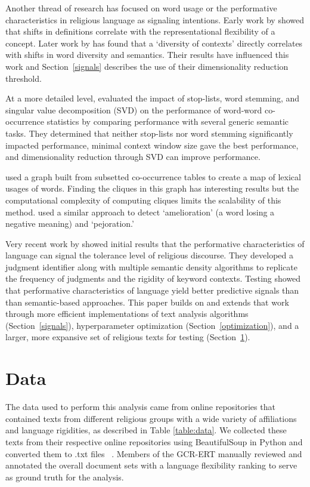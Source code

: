 \documentclass[11pt, a4paper]{article}
\begin{document}
Another thread of research has focused on word usage or the performative characteristics in religious language as signaling intentions. Early work by   showed that shifts in definitions correlate with the representational flexibility of a concept. Later work by  has found that a `diversity of contexts' directly correlates with shifts in word diversity and semantics. Their results have influenced this work and Section~\ref{signals} describes the use of their dimensionality reduction threshold.

At a more detailed level,  evaluated the impact of stop-lists, word stemming, and singular value decomposition (SVD) on the performance of word-word co-occurrence statistics by comparing performance with several generic semantic tasks. They determined that neither stop-lists nor word stemming significantly impacted performance, minimal context window size gave the best performance, and dimensionality reduction through SVD can improve performance.  

 used a graph built from subsetted co-occurrence tables to create a map of lexical usages of words. Finding the cliques in this graph has interesting results but the computational complexity of computing cliques limits the scalability of this method.  used a similar approach to detect `amelioration' (a word losing a negative meaning) and `pejoration.' 

Very recent work by  showed initial results that the performative characteristics of language can signal the tolerance level of religious discourse. They developed a judgment identifier along with multiple semantic density algorithms to replicate the frequency of judgments and the rigidity of keyword contexts. Testing showed that performative characteristics of language yield better predictive signals than than semantic-based approaches. This paper builds on and extends that work through more efficient implementations of text analysis algorithms (Section~\ref{signals}), hyperparameter optimization (Section~\ref{optimization}), and a larger, more expansive set of religious texts for testing (Section~\ref{data}).  

\section{Data}\label{data}

The data used to perform this analysis came from online repositories that contained texts from different religious groups with a wide variety of affiliations and language rigidities, as described in Table \ref{table:data}. We collected these texts from their respective online repositories using BeautifulSoup in Python and converted them to .txt files ~\cite{Richardson2015}. Members of the GCR-ERT manually reviewed and annotated the overall document sets with a language flexibility ranking to serve as ground truth for the analysis.
\end{document}
